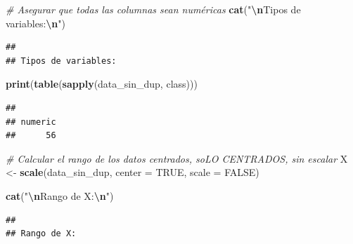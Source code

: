 \documentclass[
]{article}
\newenvironment{Shaded}{\begin{snugshade}}{\end{snugshade}}
\newcommand{\AttributeTok}[1]{\textcolor[rgb]{0.13,0.29,0.53}{#1}}
\newcommand{\CommentTok}[1]{\textcolor[rgb]{0.56,0.35,0.01}{\textit{#1}}}
\newcommand{\ConstantTok}[1]{\textcolor[rgb]{0.56,0.35,0.01}{#1}}
\newcommand{\FloatTok}[1]{\textcolor[rgb]{0.00,0.00,0.81}{#1}}
\newcommand{\FunctionTok}[1]{\textcolor[rgb]{0.13,0.29,0.53}{\textbf{#1}}}
\newcommand{\NormalTok}[1]{#1}
\newcommand{\OtherTok}[1]{\textcolor[rgb]{0.56,0.35,0.01}{#1}}
\newcommand{\SpecialCharTok}[1]{\textcolor[rgb]{0.81,0.36,0.00}{\textbf{#1}}}
\newcommand{\StringTok}[1]{\textcolor[rgb]{0.31,0.60,0.02}{#1}}
\begin{document}
\begin{Shaded}
\begin{Highlighting}[]
\CommentTok{\# Asegurar que todas las columnas sean numéricas}
\FunctionTok{cat}\NormalTok{(}\StringTok{"}\SpecialCharTok{\textbackslash{}n}\StringTok{Tipos de variables:}\SpecialCharTok{\textbackslash{}n}\StringTok{"}\NormalTok{)}
\end{Highlighting}
\end{Shaded}

\begin{verbatim}
## 
## Tipos de variables:
\end{verbatim}

\begin{Shaded}
\begin{Highlighting}[]
\FunctionTok{print}\NormalTok{(}\FunctionTok{table}\NormalTok{(}\FunctionTok{sapply}\NormalTok{(data\_sin\_dup, class)))}
\end{Highlighting}
\end{Shaded}

\begin{verbatim}
## 
## numeric 
##      56
\end{verbatim}

\begin{Shaded}
\begin{Highlighting}[]
\CommentTok{\# Calcular el rango de los datos centrados, soLO CENTRADOS, sin escalar}
\NormalTok{X }\OtherTok{\textless{}{-}} \FunctionTok{scale}\NormalTok{(data\_sin\_dup, }\AttributeTok{center =} \ConstantTok{TRUE}\NormalTok{, }\AttributeTok{scale =} \ConstantTok{FALSE}\NormalTok{)}

\FunctionTok{cat}\NormalTok{(}\StringTok{"}\SpecialCharTok{\textbackslash{}n}\StringTok{Rango de X:}\SpecialCharTok{\textbackslash{}n}\StringTok{"}\NormalTok{)}
\end{Highlighting}
\end{Shaded}

\begin{verbatim}
## 
## Rango de X:
\end{verbatim}

\begin{Shaded}
\end{Shaded}
\end{document}
